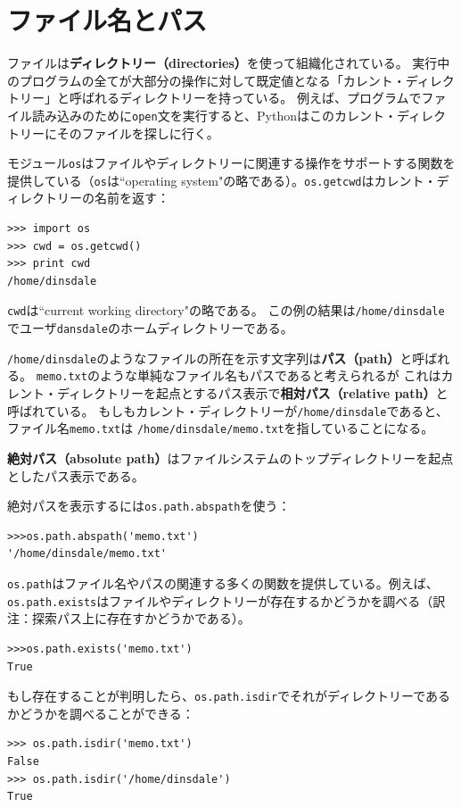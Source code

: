 \documentclass[a4j,12pt,makeidx]{jbook}
\begin{document}
\section{ファイル名とパス}
ファイルは{\bf ディレクトリー（directories）}を使って組織化されている。
実行中のプログラムの全てが大部分の操作に対して既定値となる「カレント・ディレクトリー」と呼ばれるディレクトリーを持っている。
例えば、プログラムでファイル読み込みのために{\tt open}文を実行すると、Pythonはこのカレント・ディレクトリーにそのファイルを探しに行く。\par
モジュール{\tt os}はファイルやディレクトリーに関連する操作をサポートする関数を提供している（{\tt os}は``operating system"の略である）。{\tt os.getcwd}はカレント・ディレクトリーの名前を返す：
\begin{verbatim}
>>> import os
>>> cwd = os.getcwd()
>>> print cwd
/home/dinsdale
\end{verbatim} 
{\tt cwd}は``current working directory"の略である。
この例の結果は{\verb"/home/dinsdale"}でユーザ{\tt dansdale}のホームディレクトリーである。\par
{\verb"/home/dinsdale"}のようなファイルの所在を示す文字列は{\bf パス（path）}と呼ばれる。
{\tt memo.txt}のような単純なファイル名もパスであると考えられるが
これはカレント・ディレクトリーを起点とするパス表示で{\bf 相対パス（relative path）}と呼ばれている。
もしもカレント・ディレクトリーが{\verb"/home/dinsdale"}であると、ファイル名{\tt memo.txt}は
{\verb"/home/dinsdale/memo.txt"}を指していることになる。\par
{\bf 絶対パス（absolute path）}はファイルシステムのトップディレクトリーを起点としたパス表示である。\par
絶対パスを表示するには{\tt os.path.abspath}を使う：
\begin{verbatim}
>>>os.path.abspath('memo.txt')
'/home/dinsdale/memo.txt'
\end{verbatim} 
{\tt os.path}はファイル名やパスの関連する多くの関数を提供している。例えば、
{\tt os.path.exists}はファイルやディレクトリーが存在するかどうかを調べる（訳注：探索パス上に存在すかどうかである）。
\begin{verbatim}
>>>os.path.exists('memo.txt')
True
\end{verbatim}  \par
もし存在することが判明したら、{\tt os.path.isdir}でそれがディレクトリーであるかどうかを調べることができる：
\begin{verbatim}
>>> os.path.isdir('memo.txt')
False
>>> os.path.isdir('/home/dinsdale')
True
\end{verbatim}
\end{document}
